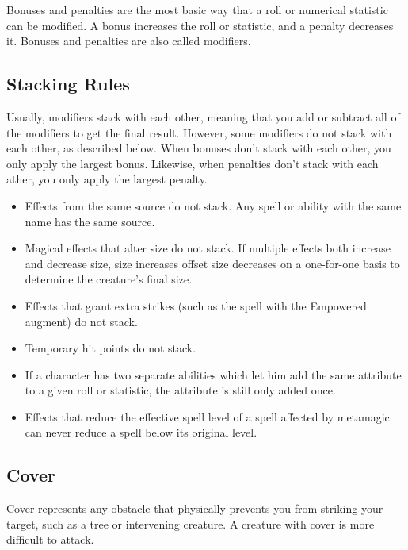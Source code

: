     Bonuses and penalties are the most basic way that a roll or numerical statistic can be modified. A bonus increases the roll or statistic, and a penalty decreases it. Bonuses and penalties are also called modifiers.

    \subsection{Stacking Rules}\label{Stacking Rules}
        Usually, modifiers stack with each other, meaning that you add or subtract all of the modifiers to get the final result. However, some modifiers do not stack with each other, as described below. When bonuses don't stack with each other, you only apply the largest bonus. Likewise, when penalties don't stack with each ather, you only apply the largest penalty.


        \begin{itemize}
            \item Effects from the same source do not stack. Any spell or ability with the same name has the same source.
            \item Magical effects that alter size do not stack. If multiple effects both increase and decrease size, size increases offset size decreases on a one-for-one basis to determine the creature's final size.
            \item Effects that grant extra strikes (such as the  spell with the Empowered augment) do not stack.
            \item Temporary hit points do not stack.
            \item If a character has two separate abilities which let him add the same attribute to a given roll or statistic, the attribute is still only added once.
            \item Effects that reduce the effective spell level of a spell affected by metamagic can never reduce a spell below its original level.
        \end{itemize}

    \subsection{Cover}\label{Cover}

        Cover represents any obstacle that physically prevents you from striking your target, such as a tree or intervening creature. A creature with cover is more difficult to attack.

